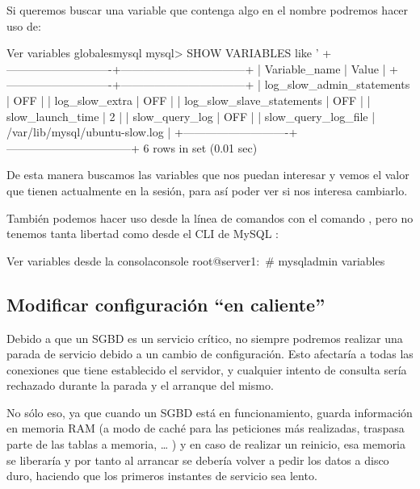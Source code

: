 Si queremos buscar una variable que contenga algo en el nombre podremos hacer uso de:

\begin{mycode}{Ver variables globales}{mysql}{}
mysql> SHOW VARIABLES like '%
+----------------------------+---------------------------------+
| Variable_name              | Value                           |
+----------------------------+---------------------------------+
| log_slow_admin_statements  | OFF                             |
| log_slow_extra             | OFF                             |
| log_slow_slave_statements  | OFF                             |
| slow_launch_time           | 2                               |
| slow_query_log             | OFF                             |
| slow_query_log_file        | /var/lib/mysql/ubuntu-slow.log  |
+----------------------------+---------------------------------+
6 rows in set (0.01 sec)
\end{mycode}

De esta manera buscamos las variables que nos puedan interesar y vemos el valor que tienen actualmente en la sesión, para así poder ver si nos interesa cambiarlo.

También podemos hacer uso desde la línea de comandos con el comando , pero no tenemos tanta libertad como desde el CLI de MySQL :

\begin{mycode}{Ver variables desde la consola}{console}{}
root@server1:~# mysqladmin  variables
\end{mycode}

\subsection{Modificar configuración “en caliente”}
Debido a que un SGBD es un servicio crítico, no siempre podremos realizar una parada de servicio debido a un cambio de configuración. Esto afectaría a todas las conexiones que tiene establecido el servidor, y cualquier intento de consulta sería rechazado durante la parada y el arranque del mismo.

No sólo eso, ya que cuando un SGBD está en funcionamiento, guarda información en memoria RAM (a modo de caché para las peticiones más realizadas, traspasa parte de las tablas a memoria, … ) y en caso de realizar un reinicio, esa memoria se liberaría y por tanto al arrancar se debería volver a pedir los datos a disco duro, haciendo que los primeros instantes de servicio sea lento.


